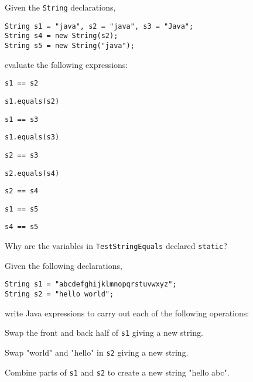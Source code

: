 \label{self-study-exercises}
\begin{SSTUDY}

\item  Given the  {\tt String} declarations,

\begin{jjjlisting}
\begin{lstlisting}
String s1 = "java", s2 = "java", s3 = "Java";
String s4 = new String(s2);
String s5 = new String("java");
\end{lstlisting}
\end{jjjlisting}

\noindent evaluate the following expressions:

\begin{EXRLL}
\begin{multicols}{3}
\item  \verb|s1 == s2|       
\item  \verb|s1.equals(s2)|  
\item  \verb|s1 == s3|       
\item  \verb|s1.equals(s3)|  
\item  \verb|s2 == s3|       
\item  \verb|s2.equals(s4)|  
\item  \verb|s2 == s4|       
\item  \verb|s1 == s5|       
\item  \verb|s4 == s5|       
\end{multicols}
\end{EXRLL}


\item  Why are the variables in {\tt TestStringEquals} declared {\tt static}?

\item  Given the following declarations,

\begin{jjjlisting}
\begin{lstlisting}
String s1 = "abcdefghijklmnopqrstuvwxyz";
String s2 = "hello world";
\end{lstlisting}
\end{jjjlisting}

\noindent write Java expressions to carry out each of the following
operations:

\begin{EXRLL}
\item  Swap the front and back half of {\tt s1} giving a new string.
\item  Swap "world" and "hello" in {\tt s2} giving a new string.
\item  Combine parts of {\tt s1} and {\tt s2} to create a new string "hello abc".
\end{EXRLL}

\end{SSTUDY}


